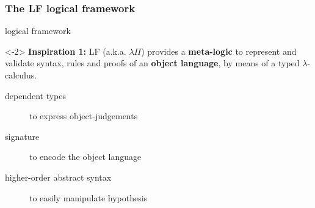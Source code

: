 \documentclass[ignorenonframetext,red]{beamer}
\begin{document}
\subsubsection{The LF logical framework}

\begin{frame}{ logical framework }
  \begin{onlyenv}<-2>
    \textbf{Inspiration 1:} LF  (a.k.a. $\lambda\Pi$) provides a {\bf
      meta-logic} to represent and validate syntax, rules and proofs
    of an \textbf{object language}, by means of a typed
    $\lambda$-calculus.

    \begin{description}
    \item[dependent types] to express object-judgements
    \item[signature] to encode the object language
    \item[higher-order abstract syntax] to easily manipulate hypothesis
    \end{description}
    \pause
    \begin{examples}
\end{examples}
\end{onlyenv}
\end{frame}
\end{document}
